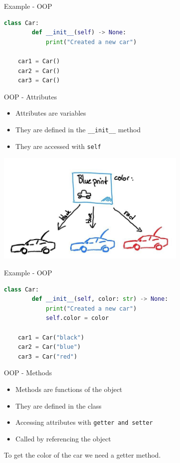 \documentclass{beamer}
\begin{document}
\begin{frame}[fragile]{Example - OOP}
    \begin{lstlisting}[language=Python]
    class Car:
        def __init__(self) -> None:
            print("Created a new car")
        
    car1 = Car()
    car2 = Car()
    car3 = Car()

    \end{lstlisting}

\end{frame}


\begin{frame}{OOP - Attributes}
    \begin{itemize}
        \item Attributes are variables
        \item They are defined in the \texttt{\_\_init\_\_} method
        \item They are accessed with \texttt{self}
    \end{itemize}
    \begin{center}
        \includegraphics[width=0.7\textwidth]{figures/attribut_color.jpg}
    \end{center}

\end{frame}

\begin{frame}[fragile]{Example - OOP}
    \begin{lstlisting}[language=Python]
    class Car:
        def __init__(self, color: str) -> None:
            print("Created a new car")
            self.color = color
        
    car1 = Car("black")
    car2 = Car("blue")
    car3 = Car("red")

    \end{lstlisting}
       
\end{frame}

\begin{frame}{OOP - Methods}
    
    \begin{itemize}
        \item Methods are functions of the object
        \item They are defined in the class
        \item Accessing attributes with \texttt{getter and setter}
        \item Called by referencing the object
    \end{itemize}
    To get the color of the car we need a getter method.

\end{frame}
\end{document}
